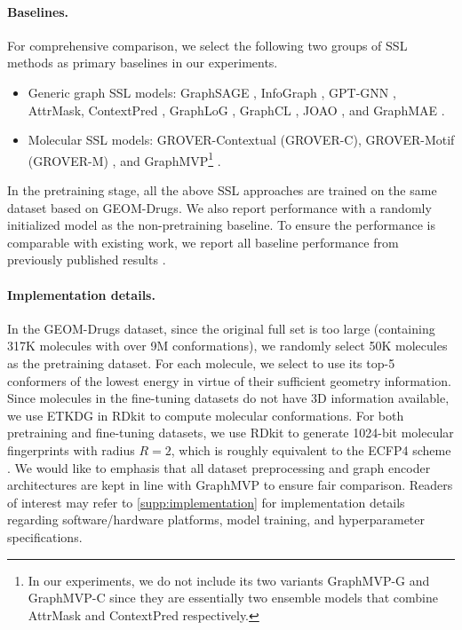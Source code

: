 \paragraph{Baselines.}
For comprehensive comparison, we select the following two groups of SSL methods as primary baselines in our experiments.
\begin{itemize}
	\item Generic graph SSL models: GraphSAGE \cite{Hamilton:2017tp}, InfoGraph \cite{Sun:2020vi}, GPT-GNN \cite{Hu:2020vh}, AttrMask, ContextPred \cite{Hu:2020uz}, GraphLoG \cite{Xu:2021tv}, GraphCL \cite{You:2020ut}, JOAO \cite{You:2021wl}, and GraphMAE \cite{Hou:2022jl}.
	\item Molecular SSL models: GROVER-Contextual (GROVER-C), GROVER-Motif (GROVER-M) \cite{Rong:2020vk}, and GraphMVP\footnote{In our experiments, we do not include its two variants GraphMVP-G and GraphMVP-C since they are essentially two ensemble models that combine AttrMask and ContextPred \cite{Hu:2020uz} respectively.} \cite{Liu:2022vr}.
\end{itemize}
In the pretraining stage, all the above SSL approaches are trained on the same dataset based on GEOM-Drugs.
We also report performance with a randomly initialized model as the non-pretraining baseline.
To ensure the performance is comparable with existing work, we report all baseline performance from previously published results \cite{Liu:2022vr,Hou:2022jl}.

\paragraph{Implementation details.}
\label{sec:implementation}

In the GEOM-Drugs dataset, since the original full set is too large (containing 317K molecules with over 9M conformations), we randomly select 50K molecules as the pretraining dataset.
For each molecule, we select to use its top-5 conformers of the lowest energy in virtue of their sufficient geometry information.
Since molecules in the fine-tuning datasets do not have 3D information available, we use ETKDG \cite{Riniker:2015bi} in RDkit \cite{Landrum:2022rd} to compute molecular conformations.
For both pretraining and fine-tuning datasets, we use RDkit to generate 1024-bit molecular fingerprints with radius $R=2$, which is roughly equivalent to the ECFP4 scheme \cite{Rogers:2010fp}.
We would like to emphasis that all dataset preprocessing and graph encoder architectures are kept in line with GraphMVP \cite{Liu:2022vr} to ensure fair comparison.
Readers of interest may refer to \cref{supp:implementation} for implementation details regarding software/hardware platforms, model training, and hyperparameter specifications.

